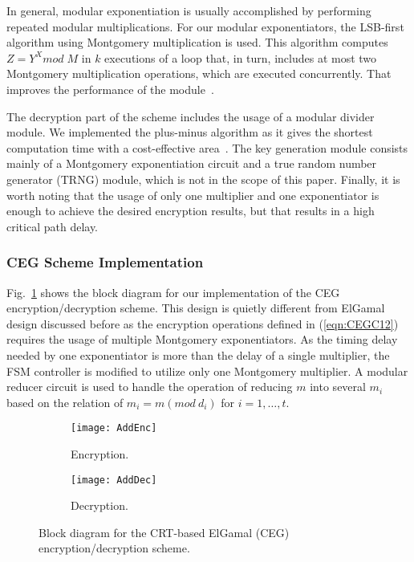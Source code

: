\documentclass[conference]{IEEEtran}
\begin{document}
In general, modular exponentiation is usually accomplished by performing repeated modular multiplications. For our modular exponentiators, the LSB-first algorithm using Montgomery multiplication is used. This algorithm computes $Z = Y^X mod \; M$ in $k$ executions of a loop that, in turn, includes at most two Montgomery multiplication operations, which are executed concurrently. That improves the performance of the module{\color{blue}~\cite{book:Deschamps09}}. 

The decryption part of the scheme includes the usage of a modular divider module. We implemented the plus-minus algorithm as it gives the shortest computation time with a cost-effective area{\color{blue}~\cite{jour:Div06}}. The key generation module consists mainly of a Montgomery exponentiation circuit and a true random number generator (TRNG) module, which is not in the scope of this paper. Finally, it is worth noting that the usage of only one multiplier and one exponentiator is enough to achieve the desired encryption results, but that results in a high critical path delay. 
 
\subsubsection{\textbf{CEG Scheme Implementation}}

Fig.~\ref{fig:Add} shows the block diagram for our implementation of the CEG encryption/decryption scheme. This design is quietly different from ElGamal design discussed before as the encryption operations defined in (\ref{eqn:CEGC12}) requires the usage of multiple Montgomery exponentiators. As the timing delay needed by one exponentiator is more than the delay of a single multiplier, the FSM controller is modified to utilize only one Montgomery multiplier. A modular reducer circuit is used to handle the operation of reducing $m$ into several $m_i$ based on the relation of $m_i = m (mod \: d_i)$ for $i = 1,\dots,t$.  

\begin{figure}
    \centering
    \begin{subfigure}[bh]{0.73\linewidth}\centering
            \texttt{[image: AddEnc]}
            \caption{Encryption.}
    \end{subfigure}
    \begin{subfigure}[bh]{0.73\linewidth}\centering
            \texttt{[image: AddDec]}
            \caption{Decryption.}
    \end{subfigure}
    \caption{Block diagram for the CRT-based ElGamal (CEG) encryption/decryption scheme.}
    \label{fig:Add}
\end{figure}
\end{document}
